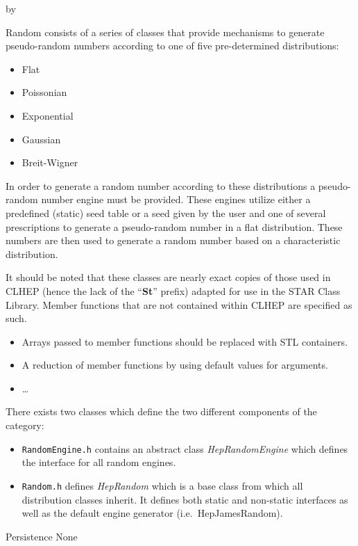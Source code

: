 \documentclass[twoside]{article}
\newcommand{\comp}[1]{\texttt{#1}}%
\newcommand{\entrylabel}[1]{\mbox{\textbf{{#1}}}\hfil}%
\newenvironment{entry}
{\begin{list}{}%
    {\renewcommand{\makelabel}{\entrylabel}%
     \setlength{\labelwidth}{90pt}%
     \setlength{\leftmargin}{\labelwidth}
     \advance\leftmargin by \labelsep%
      }%
    }%
  {\end{list}}
\newcommand{\Entrylabel}[1]%
{\raisebox{0pt}[1ex][0pt]{\makebox[\labelwidth][l]%
    {\parbox[t]{\labelwidth}{\hspace{0pt}\textbf{{#1}}}}}}
\newenvironment{Entry}%
{\renewcommand{\entrylabel}{\Entrylabel}\begin{entry}}%
  {\end{entry}}
\begin{document}
\begin{description}
\begin{Entry}
  Random consists of a series of classes that provide mechanisms to
  generate pseudo-random numbers according to one of five pre-determined
  distributions:
  \begin{itemize}
   \item Flat
   \item Poissonian
   \item Exponential
   \item Gaussian
   \item Breit-Wigner
  \end{itemize}

  In order to generate a random number according to these distributions
  a pseudo-random number engine must be provided.  These engines
  utilize either a predefined (static) seed table 
  or a seed given by the user and one of several prescriptions
  to generate a pseudo-random
  number in a flat distribution.  These numbers are then used to generate
  a random number based on a characteristic distribution.
  
  It should be noted that these classes are nearly exact copies of those
  used in CLHEP (hence the lack of the ``{\bf St}'' prefix)
  adapted for use in the STAR Class Library.  Member functions that
  are not contained within CLHEP are specified as such.
  
  \begin{itemize}
    \item Arrays passed to member functions should be replaced with
      STL containers.
    \item A reduction of member functions by using default values for
      arguments.
    \item \ldots
  \end{itemize}
  
  There exists two classes which define the two different components
  of the category:
  \begin{itemize}
    \item \comp{RandomEngine.h} contains an abstract class {\em HepRandomEngine}
      which defines the interface for all random engines.
    \item \comp{Random.h} defines  {\em HepRandom} which is a base class
      from which all distribution classes inherit.  It defines both
      static and non-static interfaces as well as the default engine
      generator (i.e.~HepJamesRandom).
    \end{itemize}
    
\item[Persistence]
    None


\end{Entry}
\end{description}
\end{document}

